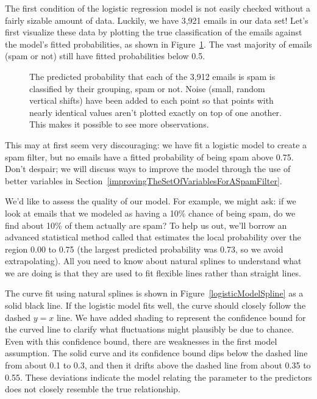 The first condition of the logistic regression model is not easily checked without a fairly sizable amount of data. Luckily, we have 3,921 emails in our data set! Let's first visualize these data by plotting the true classification of the emails against the model's fitted probabilities, as shown in Figure~\ref{logisticModelPredict}. The vast majority of emails (spam or not) still have fitted probabilities below 0.5.

\begin{figure}[h]
  \centering
  \caption{The predicted probability that each of the
      3,912 emails is spam is classified by their grouping,
      spam or not.
      Noise (small, random vertical shifts) have been added
      to each point so that points with nearly identical
      values aren't plotted exactly on top of one another.
      This makes it possible to see more observations.}
  \label{logisticModelPredict}
\end{figure}

This may at first seem very discouraging: we have fit a logistic model to create a spam filter, but no emails have a fitted probability of being spam above 0.75. Don't despair; we will discuss ways to improve the model through the use of better variables in Section~\ref{improvingTheSetOfVariablesForASpamFilter}.

We'd like to assess the quality of our model. For example, we might ask: if we look at emails that we modeled as having a 10\% chance of being spam, do we find about 10\% of them actually are spam? To help us out, we'll borrow an advanced statistical method called  that estimates the local probability over the region 0.00 to 0.75 (the largest predicted probability was 0.73, so we avoid extrapolating). All you need to know about natural splines to understand what we are doing is that they are used to fit flexible lines rather than straight lines.

The curve fit using natural splines is shown in Figure~\ref{logisticModelSpline} as a solid black line. If the logistic model fits well, the curve should closely follow the dashed $y=x$ line. We have added shading to represent the confidence bound for the curved line to clarify what fluctuations might plausibly be due to chance. Even with this confidence bound, there are weaknesses in the first model assumption. The solid curve and its confidence bound dips below the dashed line from about 0.1 to 0.3, and then it drifts above the dashed line from about 0.35 to 0.55. These deviations indicate the model relating the parameter to the predictors does not closely resemble the true relationship.

